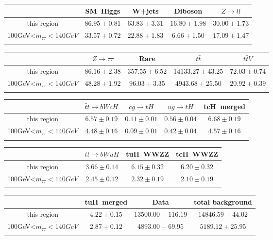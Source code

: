 \centering
\begin{tabular}{ccccc} \toprule\toprule
 & SM~Higgs & W+jets & Diboson & $Z\to ll$\\\midrule
this region & $86.95\pm0.81$ & $63.83\pm3.31$ & $16.80\pm1.98$ & $30.00\pm1.73$\\
100GeV<$m_{\tau\tau}<140GeV$ & $33.57\pm0.72$ & $22.88\pm1.83$ & $6.66\pm1.50$ & $17.09\pm1.47$\\
\bottomrule\bottomrule\\
\end{tabular}
\begin{tabular}{ccccc} \toprule\toprule
 & $Z\to \tau\tau$ & Rare & $t\bar{t}$ & $t\bar{t}V$\\\midrule
this region & $86.16\pm2.38$ & $357.55\pm6.52$ & $14133.27\pm43.25$ & $72.03\pm0.74$\\
100GeV<$m_{\tau\tau}<140GeV$ & $48.28\pm1.92$ & $96.03\pm3.35$ & $4943.68\pm25.50$ & $20.92\pm0.39$\\
\bottomrule\bottomrule\\
\end{tabular}
\begin{tabular}{ccccc} \toprule\toprule
 & $\bar{t}t\to bWcH$ & $cg\to tH$ & $ug\to tH$ & tcH~merged\\\midrule
this region & $6.57\pm0.19$ & $0.11\pm0.01$ & $0.56\pm0.04$ & $6.68\pm0.19$\\
100GeV<$m_{\tau\tau}<140GeV$ & $4.48\pm0.16$ & $0.09\pm0.01$ & $0.42\pm0.04$ & $4.57\pm0.16$\\
\bottomrule\bottomrule\\
\end{tabular}
\begin{tabular}{cccc} \toprule\toprule
 & $\bar{t}t\to bWuH$ & tuH~WWZZ & tcH~WWZZ\\\midrule
this region & $3.66\pm0.14$ & $6.15\pm0.32$ & $6.20\pm0.32$\\
100GeV<$m_{\tau\tau}<140GeV$ & $2.45\pm0.12$ & $2.32\pm0.19$ & $2.10\pm0.19$\\
\bottomrule\bottomrule\\
\end{tabular}
\begin{tabular}{cccc} \toprule\toprule
 & tuH~merged & Data & total background\\\midrule
this region & $4.22\pm0.15$ & $13500.00\pm116.19$ & $14846.59\pm44.02$\\
100GeV<$m_{\tau\tau}<140GeV$ & $2.87\pm0.12$ & $4893.00\pm69.95$ & $5189.12\pm25.95$\\
\bottomrule\bottomrule\\
\end{tabular}
